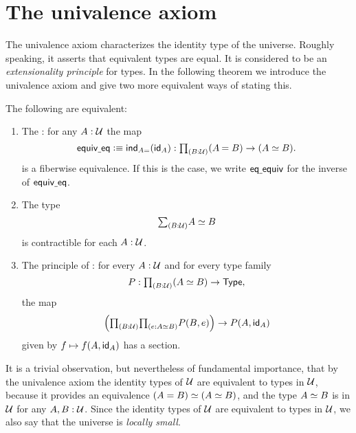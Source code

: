 \section{The univalence axiom}

The univalence axiom characterizes the identity type of the universe. Roughly speaking, it asserts that equivalent types are equal. It is considered to be an \emph{extensionality principle} for types. In the following theorem we introduce the univalence axiom and give two more equivalent ways of stating this.

\begin{thm}\label{thm:univalence}
The following are equivalent:
\begin{enumerate}
\item The : for any $A:\UU$ the map
\begin{equation*}
\equiveq\defeq \ind{A=}(\idfunc[A]) : \prd{B:\UU} (\id{A}{B})\to(\eqv{A}{B}).
\end{equation*}
is a fiberwise equivalence. If this is the case, we write
$\eqequiv$
for the inverse of $\equiveq$.
\item The type
\begin{equation*}
\sm{B:\UU}\eqv{A}{B}
\end{equation*}
is contractible for each $A:\UU$.
\item The principle of : for every $A:\UU$ and for every type family
\begin{equation*}
P:\prd{B:\UU} (\eqv{A}{B})\to \type,
\end{equation*}
the map
\begin{equation*}
\Big(\prd{B:\UU}{e:\eqv{A}{B}}P(B,e)\Big)\to P(A,\idfunc[A])
\end{equation*}
given by $f\mapsto f(A,\idfunc[A])$ has a section.\qedhere
\end{enumerate}
\end{thm}

It is a trivial observation, but nevertheless of fundamental importance, that by the univalence axiom the identity types of $\UU$ are equivalent to types in $\UU$, because it provides an equivalence $\eqv{(A=B)}{(\eqv{A}{B})}$, and the type $\eqv{A}{B}$ is in $\UU$ for any $A,B:\UU$. Since the identity types of $\UU$ are equivalent to types in $\UU$, we also say that the universe is \emph{locally small}.

